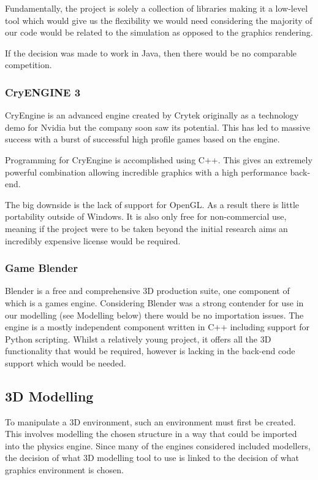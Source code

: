 Fundamentally, the project is solely a collection of libraries making
it a low-level tool which would give us the flexibility we would need
considering the majority of our code would be related to the simulation
as opposed to the graphics rendering.

If the decision was made to work in Java, then there would be no comparable competition.


\subsubsection{CryENGINE 3}

CryEngine is an advanced engine created by Crytek originally as a
technology demo for Nvidia but the company soon saw its potential.
This has led to massive success with a burst of successful high profile
games based on the engine.

Programming for CryEngine is accomplished using C++. This gives an extremely
powerful combination allowing incredible graphics with a high performance
back-end.

The big downside is the lack of support for OpenGL. As a result there
is little portability outside of Windows. It is also only free for
non-commercial use, meaning if the project were to be taken beyond
the initial research aims an incredibly expensive license would be
required.


\subsubsection{Game Blender}

Blender is a free and comprehensive 3D production suite, one component
of which is a games engine. Considering Blender was a strong contender
for use in our modelling (see Modelling below) there would be no importation
issues. The engine is a mostly independent component written in C++
including support for Python scripting. Whilst a relatively young
project, it offers all the 3D functionality that would be required,
however is lacking in the back-end code support which would be needed.


\subsection{3D Modelling}

To manipulate a 3D environment, such an environment must first be created. This
involves modelling the chosen structure in a way that could be imported
into the physics engine. Since many of the engines considered included
modellers, the decision of what 3D modelling tool to use is linked to the decision of what graphics environment is chosen. 

